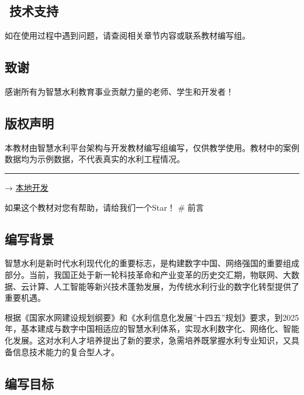 \hypertarget{ux6280ux672fux652fux6301-1}{%
\subsection{\texorpdfstring{️ 技术支持}{️ 技术支持}}\label{ux6280ux672fux652fux6301-1}}

如在使用过程中遇到问题，请查阅相关章节内容或联系教材编写组。

\hypertarget{ux81f4ux8c22-1}{%
\subsection{致谢}\label{ux81f4ux8c22-1}}

感谢所有为智慧水利教育事业贡献力量的老师、学生和开发者！

\hypertarget{ux7248ux6743ux58f0ux660e-1}{%
\subsection{版权声明}\label{ux7248ux6743ux58f0ux660e-1}}

本教材由智慧水利平台架构与开发教材编写组编写，仅供教学使用。教材中的案例数据均为示例数据，不代表真实的水利工程情况。

\begin{center}\rule{0.5\linewidth}{0.5pt}\end{center}

 → \protect\hyperlink{ux672cux5730ux5f00ux53d1}{本地开发}

如果这个教材对您有帮助，请给我们一个Star！ \# 前言

\hypertarget{ux7f16ux5199ux80ccux666f}{%
\subsection{编写背景}\label{ux7f16ux5199ux80ccux666f}}

智慧水利是新时代水利现代化的重要标志，是构建数字中国、网络强国的重要组成部分。当前，我国正处于新一轮科技革命和产业变革的历史交汇期，物联网、大数据、云计算、人工智能等新兴技术蓬勃发展，为传统水利行业的数字化转型提供了重要机遇。

根据《国家水网建设规划纲要》和《水利信息化发展''十四五''规划》要求，到2025年，基本建成与数字中国相适应的智慧水利体系，实现水利数字化、网络化、智能化发展。这对水利人才培养提出了新的要求，急需培养既掌握水利专业知识，又具备信息技术能力的复合型人才。

\hypertarget{ux7f16ux5199ux76eeux6807}{%
\subsection{编写目标}\label{ux7f16ux5199ux76eeux6807}}

